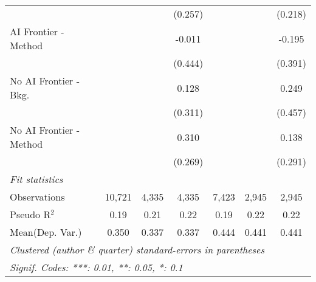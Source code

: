 \begin{tabular}{lcccccc}
                           &               &         & (0.257)      &               &             & (0.218)\\   
   AI Frontier - Method    &               &         & -0.011       &               &             & -0.195\\   
                           &               &         & (0.444)      &               &             & (0.391)\\   
   No AI Frontier - Bkg.   &               &         & 0.128        &               &             & 0.249\\   
                           &               &         & (0.311)      &               &             & (0.457)\\   
   No AI Frontier - Method &               &         & 0.310        &               &             & 0.138\\   
                           &               &         & (0.269)      &               &             & (0.291)\\   
   \midrule
   \emph{Fit statistics}\\
   Observations            & 10,721        & 4,335   & 4,335        & 7,423         & 2,945       & 2,945\\  
   Pseudo R$^2$            & 0.19          & 0.21    & 0.22         & 0.19          & 0.22        & 0.22\\  
Mean(Dep. Var.) & 0.350 & 0.337 & 0.337 & 0.444 & 0.441 & 0.441 \\
   \midrule \midrule
   \multicolumn{7}{l}{\emph{Clustered (author \& quarter) standard-errors in parentheses}}\\
   \multicolumn{7}{l}{\emph{Signif. Codes: ***: 0.01, **: 0.05, *: 0.1}}\\
\end{tabular}
\par\endgroup
